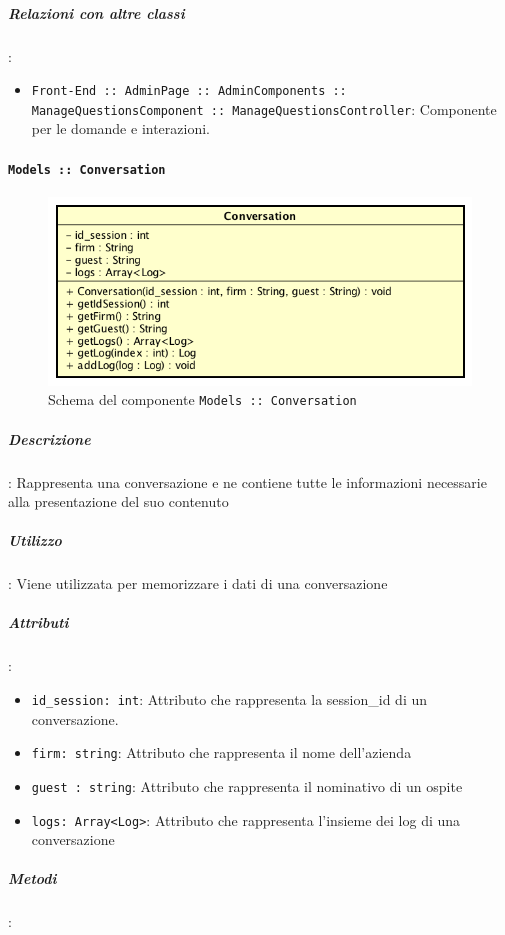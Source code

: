 \documentclass[../DefinizioneDiProdotto_v2.0.0.tex]{subfiles}
\begin{document}
		\subparagraph{Relazioni con altre classi}:
		      \begin{itemize}
		      	\item \texttt{Front-End :: AdminPage :: AdminComponents :: ManageQuestionsComponent :: ManageQuestionsController}: Componente per le domande e interazioni.
		      \end{itemize}


\newpage
	\paragraph{\texttt{Models :: Conversation}}
	\acapo
	\begin{figure}[!h]
		\centering
		\includegraphics[scale=0.6]{Architettura/Front-End/Models/Conversation.png}
		\caption{Schema del componente \texttt{Models :: Conversation}}
	\end{figure}
		\subparagraph{Descrizione}: Rappresenta una conversazione e ne contiene tutte le informazioni necessarie alla presentazione del suo contenuto
		\subparagraph{Utilizzo}: Viene utilizzata per memorizzare i dati di una conversazione
		\subparagraph{Attributi}:
				\begin{itemize}
					\item \texttt{id\_session: int}: Attributo che rappresenta la session\_id di un conversazione.

					\item \texttt{firm: string}: Attributo che rappresenta il nome dell'azienda

					\item \texttt{guest : string}: Attributo che rappresenta il nominativo di un ospite

					\item \texttt{logs: Array<Log>}: Attributo che rappresenta l'insieme dei log di una conversazione
				\end{itemize}
			\subparagraph{Metodi}:
\end{document}
